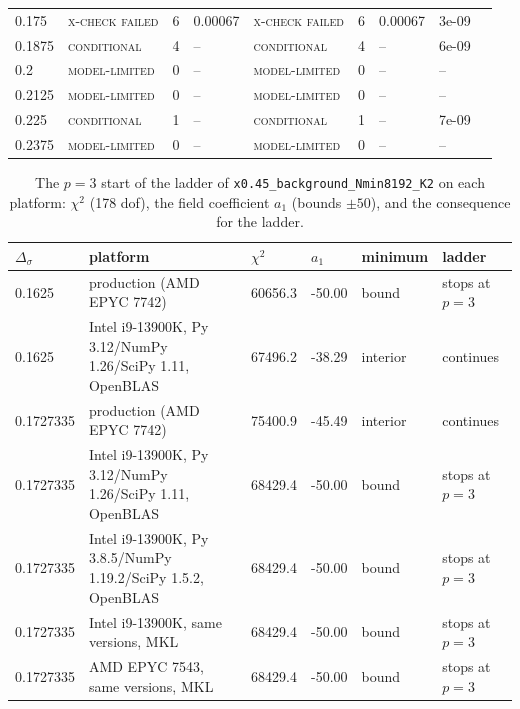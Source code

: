 \documentclass[10pt,a4paper]{article}
\newcommand{\Ds}{\Delta_\sigma}
\newcommand{\code}[1]{\texttt{#1}}
\newcommand{\lbl}[1]{{\mdseries\scshape #1}}
\begin{document}
\begin{table}[htbp]
\begin{tabular}{@{}lllllllll@{}}
0.175 & \lbl{x-check failed} & 6 & 0.00067 & \lbl{x-check failed} & 6 & 0.00067 & 3e-09 &  \\
0.1875 & \lbl{conditional} & 4 & -- & \lbl{conditional} & 4 & -- & 6e-09 &  \\
0.2 & \lbl{model-limited} & 0 & -- & \lbl{model-limited} & 0 & -- & -- &  \\
0.2125 & \lbl{model-limited} & 0 & -- & \lbl{model-limited} & 0 & -- & -- &  \\
0.225 & \lbl{conditional} & 1 & -- & \lbl{conditional} & 1 & -- & 7e-09 &  \\
0.2375 & \lbl{model-limited} & 0 & -- & \lbl{model-limited} & 0 & -- & -- &  \\
\bottomrule\end{tabular}
\end{table}
\begin{table}[htbp]\centering\scriptsize
\caption{The $p=3$ start of the ladder of \code{x0.45\_background\_Nmin8192\_K2} on each platform: $\chi^2$ (178 dof), the field coefficient
$a_1$ (bounds $\pm50$), and the consequence for the ladder.}\label{tab:d3}
\begin{tabular}{@{}llllll@{}}\toprule
$\Ds$ & platform & $\chi^2$ & $a_1$ & minimum & ladder \\\midrule
0.1625 & production (AMD EPYC 7742) & 60656.3 & -50.00 & bound & stops at $p=3$ \\
0.1625 & Intel i9-13900K, Py 3.12/NumPy 1.26/SciPy 1.11, OpenBLAS & 67496.2 & -38.29 & interior & continues \\
0.1727335 & production (AMD EPYC 7742) & 75400.9 & -45.49 & interior & continues \\
0.1727335 & Intel i9-13900K, Py 3.12/NumPy 1.26/SciPy 1.11, OpenBLAS & 68429.4 & -50.00 & bound & stops at $p=3$ \\
0.1727335 & Intel i9-13900K, Py 3.8.5/NumPy 1.19.2/SciPy 1.5.2, OpenBLAS & 68429.4 & -50.00 & bound & stops at $p=3$ \\
0.1727335 & Intel i9-13900K, same versions, MKL & 68429.4 & -50.00 & bound & stops at $p=3$ \\
0.1727335 & AMD EPYC 7543, same versions, MKL & 68429.4 & -50.00 & bound & stops at $p=3$ \\
\bottomrule\end{tabular}
\end{table}
\end{document}
